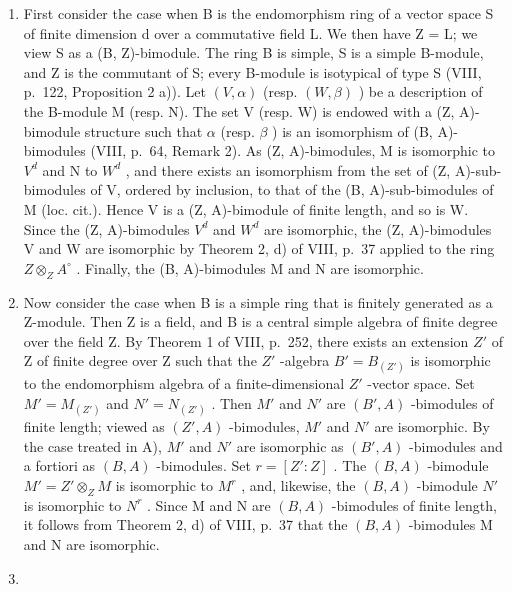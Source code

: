 \begin{enumerate}
\def\labelenumi{\Alph{enumi})}
\item
  First consider the case when B is the endomorphism ring of a vector space S of finite dimension d over a commutative field L. We then have Z = L; we view S as a (B, Z)-bimodule. The ring B is simple, S is a simple B-module, and Z is the commutant of S; every B-module is isotypical of type S (VIII, p.~122, Proposition 2 a)). Let \((V, \alpha)\) (resp. \((W, \beta)\) ) be a description of the B-module M (resp. N). The set V (resp. W) is endowed with a (Z, A)-bimodule structure such that \(\alpha\) (resp. \(\beta\) ) is an isomorphism of (B, A)-bimodules (VIII, p.~64, Remark 2). As (Z, A)-bimodules, M is isomorphic to \(V^{d}\) and N to \(W^{d}\) , and there exists an isomorphism from the set of (Z, A)-sub-bimodules of V, ordered by inclusion, to that of the (B, A)-sub-bimodules of M (loc. cit.). Hence V is a (Z, A)-bimodule of finite length, and so is W. Since the (Z, A)-bimodules \(V^{d}\) and \(W^{d}\) are isomorphic, the (Z, A)-bimodules V and W are isomorphic by Theorem 2, d) of VIII, p.~37 applied to the ring \(Z \otimes_{Z} A^{\circ}\) . Finally, the (B, A)-bimodules M and N are isomorphic.
\item
  Now consider the case when B is a simple ring that is finitely generated as a Z-module. Then Z is a field, and B is a central simple algebra of finite degree over the field Z. By Theorem 1 of VIII, p.~252, there exists an extension \(Z'\) of Z of finite degree over Z such that the \(Z'\) -algebra \(B' = B_{(Z')}\) is isomorphic to the endomorphism algebra of a finite-dimensional \(Z'\) -vector space. Set \(M' = M_{(Z')}\) and \(N' = N_{(Z')}\) . Then \(M'\) and \(N'\) are \((B', A)\) -bimodules of finite length; viewed as \((Z', A)\) -bimodules, \(M'\) and \(N'\) are isomorphic. By the case treated in A), \(M'\) and \(N'\) are isomorphic as \((B', A)\) -bimodules and a fortiori as \((B, A)\) -bimodules. Set \(r = [Z' : Z]\) . The \((B, A)\) -bimodule \(M' = Z' \otimes_{Z} M\) is isomorphic to \(M^r\) , and, likewise, the \((B, A)\) -bimodule \(N'\) is isomorphic to \(N^r\) . Since M and N are \((B, A)\) -bimodules of finite length, it follows from Theorem 2, d) of VIII, p.~37 that the \((B, A)\) -bimodules M and N are isomorphic.
\item

\end{enumerate}
